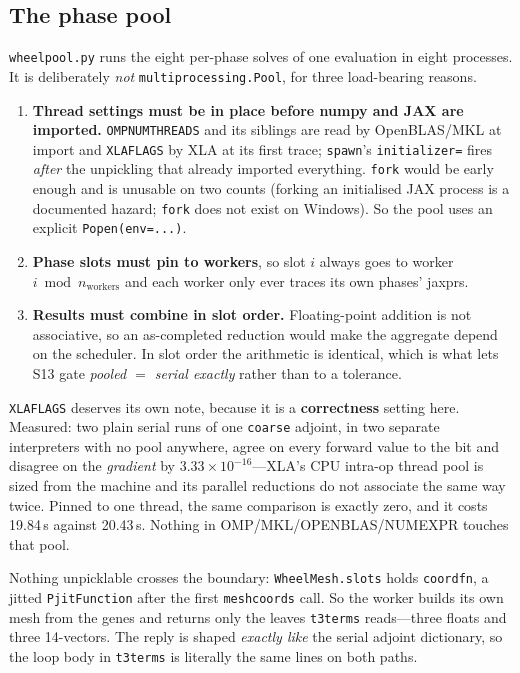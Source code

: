 \documentclass[11pt,a4paper]{article}
\DeclareRobustCommand{\code}[1]{%
  \texttt{\small\def\_{\textunderscore\discretionary{}{}{}}#1}}
\begin{document}
\subsection{The phase pool}
\label{sec:pool}

\code{wheel\_pool.py} runs the eight per-phase solves of one evaluation in eight
processes. It is deliberately \emph{not} \code{multiprocessing.Pool}, for three
load-bearing reasons.

\begin{enumerate}
\item \textbf{Thread settings must be in place before numpy and JAX are imported.}
  \code{OMP\_NUM\_THREADS} and its siblings are read by OpenBLAS/MKL at import and
  \code{XLA\_FLAGS} by XLA at its first trace; \code{spawn}'s \code{initializer=} fires
  \emph{after} the unpickling that already imported everything. \code{fork} would be
  early enough and is unusable on two counts (forking an initialised JAX process is a
  documented hazard; \code{fork} does not exist on Windows). So the pool uses an
  explicit \code{Popen(env=...)}.
\item \textbf{Phase slots must pin to workers}, so slot $i$ always goes to worker
  $i \bmod n_{\text{workers}}$ and each worker only ever traces its own phases' jaxprs.
\item \textbf{Results must combine in slot order.} Floating-point addition is not
  associative, so an as-completed reduction would make the aggregate depend on the
  scheduler. In slot order the arithmetic is identical, which is what lets S13 gate
  \emph{pooled $=$ serial exactly} rather than to a tolerance.
\end{enumerate}

\code{XLA\_FLAGS} deserves its own note, because it is a \textbf{correctness} setting
here. Measured: two plain serial runs of one \code{coarse} adjoint, in two separate
interpreters with no pool anywhere, agree on every forward value to the bit and
disagree on the \emph{gradient} by $3.33\times10^{-16}$---XLA's CPU intra-op thread pool
is sized from the machine and its parallel reductions do not associate the same way
twice. Pinned to one thread, the same comparison is exactly zero, and it costs 19.84\,s
against 20.43\,s. Nothing in OMP/MKL/OPENBLAS/NUMEXPR touches that pool.

Nothing unpicklable crosses the boundary: \code{WheelMesh.\_\_slots\_\_} holds
\code{\_coord\_fn}, a jitted \code{PjitFunction} after the first \code{mesh\_coords}
call. So the worker builds its own mesh from the genes and returns only the leaves
\code{t3\_terms} reads---three floats and three 14-vectors. The reply is shaped
\emph{exactly like} the serial adjoint dictionary, so the loop body in
\code{t3\_terms} is literally the same lines on both paths.
\end{document}
